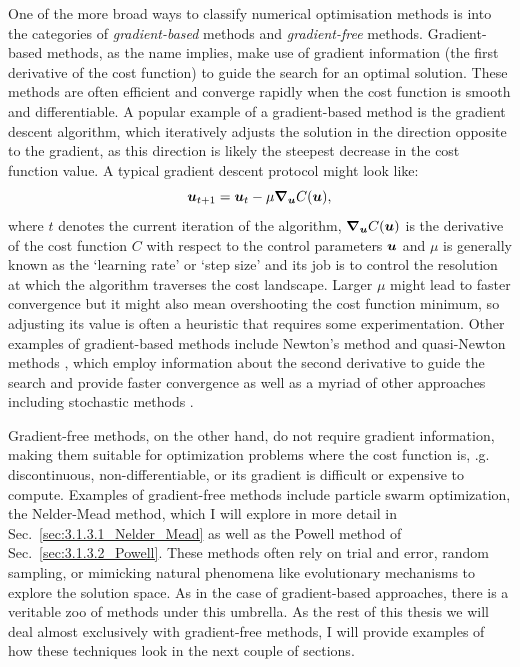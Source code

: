One of the more broad ways to classify numerical optimisation methods is into the categories of \emph{gradient-based} methods and \emph{gradient-free} methods. Gradient-based methods, as the name implies, make use of gradient information (the first derivative of the cost function) to guide the search for an optimal solution. These methods are often efficient and converge rapidly when the cost function is smooth and differentiable. A popular example of a gradient-based method is the gradient descent algorithm, which iteratively adjusts the solution in the direction opposite to the gradient, as this direction is likely the steepest decrease in the cost function value. A typical gradient descent protocol might look like:
\begin{equation}\label{eq:gradient_descent}
    \boldsymbol{u}_{t + 1} = \boldsymbol{u}_t - \mu \grad_{\boldsymbol{u}} C(\boldsymbol{u}),
\end{equation}
where $t$ denotes the current iteration of the algorithm, $\grad_{\boldsymbol{u}} C(\boldsymbol{u})$ is the derivative of the cost function $C$ with respect to the control parameters $\boldsymbol{u}$ and $\mu$ is generally known as the `learning rate' or `step size' and its job is to control the resolution at which the algorithm traverses the cost landscape. Larger $\mu$ might lead to faster convergence but it might also mean overshooting the cost function minimum, so adjusting its value is often a heuristic that requires some experimentation. Other examples of gradient-based methods include Newton's method and quasi-Newton methods \cite{suli_introduction_2003}, which employ information about the second derivative to guide the search and provide faster convergence as well as a myriad of other approaches including stochastic methods \cite{bottou_tradeoffs_2007}. 

Gradient-free methods, on the other hand, do not require gradient information, making them suitable for optimization problems where the cost function is, \@e.g.~ discontinuous, non-differentiable, or its gradient is difficult or expensive to compute. Examples of gradient-free methods include particle swarm optimization\cite{bonyadi_particle_2017}, the Nelder-Mead method, which I will explore in more detail in Sec.~\ref{sec:3.1.3.1_Nelder_Mead} as well as the Powell method of Sec.~\ref{sec:3.1.3.2_Powell}. These methods often rely on trial and error, random sampling, or mimicking natural phenomena like evolutionary mechanisms\cite{vikhar_evolutionary_2016} to explore the solution space. As in the case of gradient-based approaches, there is a veritable zoo of methods under this umbrella. As the rest of this thesis we will deal almost exclusively with gradient-free methods, I will provide examples of how these techniques look in the next couple of sections.

